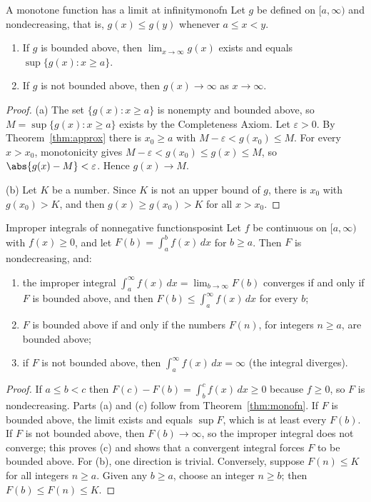 \documentclass[11pt]{article}
\begin{document}
\begin{thm}{A monotone function has a limit at infinity}{monofn}
Let $g$ be defined on $[a,\infty)$ and nondecreasing, that is, $g(x)\le g(y)$ whenever $a\le x<y$.
\begin{enumerate}[label=(\alph*)]
  \item If $g$ is bounded above, then $\lim_{x\to\infty}g(x)$ exists and equals $\sup\{g(x):x\ge a\}$.
  \item If $g$ is not bounded above, then $g(x)\to\infty$ as $x\to\infty$.
\end{enumerate}
\end{thm}
\begin{proof}
(a) The set $\{g(x):x\ge a\}$ is nonempty and bounded above, so $M=\sup\{g(x):x\ge a\}$ exists by the Completeness Axiom. Let $\varepsilon>0$. By Theorem~\ref{thm:approx} there is $x_0\ge a$ with $M-\varepsilon<g(x_0)\le M$. For every $x>x_0$, monotonicity gives $M-\varepsilon<g(x_0)\le g(x)\le M$, so $\abs{g(x)-M}<\varepsilon$. Hence $g(x)\to M$.

(b) Let $K$ be a number. Since $K$ is not an upper bound of $g$, there is $x_0$ with $g(x_0)>K$, and then $g(x)\ge g(x_0)>K$ for all $x>x_0$.
\end{proof}

\begin{thm}{Improper integrals of nonnegative functions}{posint}
Let $f$ be continuous on $[a,\infty)$ with $f(x)\ge0$, and let $F(b)=\int_a^bf(x)\,dx$ for $b\ge a$. Then $F$ is nondecreasing, and:
\begin{enumerate}[label=(\alph*)]
  \item the improper integral $\int_a^\infty f(x)\,dx=\lim_{b\to\infty}F(b)$ converges if and only if $F$ is bounded above, and then $F(b)\le\int_a^\infty f(x)\,dx$ for every $b$;
  \item $F$ is bounded above if and only if the numbers $F(n)$, for integers $n\ge a$, are bounded above;
  \item if $F$ is not bounded above, then $\int_a^\infty f(x)\,dx=\infty$ (the integral diverges).
\end{enumerate}
\end{thm}
\begin{proof}
If $a\le b<c$ then $F(c)-F(b)=\int_b^cf(x)\,dx\ge0$ because $f\ge0$, so $F$ is nondecreasing. Parts (a) and (c) follow from Theorem~\ref{thm:monofn}. If $F$ is bounded above, the limit exists and equals $\sup F$, which is at least every $F(b)$. If $F$ is not bounded above, then $F(b)\to\infty$, so the improper integral does not converge; this proves (c) and shows that a convergent integral forces $F$ to be bounded above. For (b), one direction is trivial. Conversely, suppose $F(n)\le K$ for all integers $n\ge a$. Given any $b\ge a$, choose an integer $n\ge b$; then $F(b)\le F(n)\le K$.
\end{proof}
\end{document}
